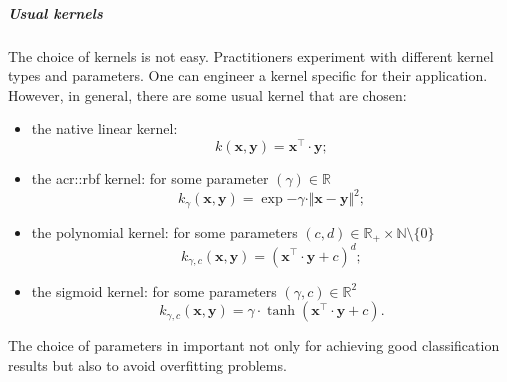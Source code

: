                 \subparagraph{Usual kernels}
                    The choice of kernels is not easy.
                    Practitioners experiment with different kernel types and parameters.
                    One can engineer a kernel specific for their application.
                    However, in general, there are some usual kernel that are chosen:
                    \begin{itemize}
                        \item the native linear kernel:
                        \begin{equation}
                            \label{eq::linear_kernel}
                            k(\bm{x}, \bm{y}) = \bm{x}^\intercal \cdot \bm{y};
                        \end{equation}
                        \item the \gls{acr::rbf} kernel: for some parameter $(\gamma) \in \mathbb{R}$
                        \begin{equation}
                            \label{eq::rbf_kernel}
                            k_{\gamma}(\bm{x}, \bm{y}) = \exp{-\gamma \cdot \Vert \bm{x} - \bm{y} \Vert^2};
                        \end{equation}
                        \item the polynomial kernel: for some parameters $(c, d) \in \mathbb{R}_+ \times \mathbb{N} \setminus \{0\} $
                        \begin{equation}
                            \label{eq::polynomial_kernel}
                            k_{\gamma, c}(\bm{x}, \bm{y}) = (\bm{x}^\intercal \cdot \bm{y} + c)^d;
                        \end{equation}
                        \item the sigmoid kernel: for some parameters $(\gamma, c) \in \mathbb{R}^2$
                        \begin{equation}
                            \label{eq::sigmoid_kernel}
                            k_{\gamma, c}(\bm{x}, \bm{y}) = \gamma \cdot \tanh(\bm{x}^\intercal \cdot \bm{y} + c).
                        \end{equation}
                    \end{itemize}
                    The choice of parameters in important not only for achieving good classification results but also to avoid overfitting problems.

